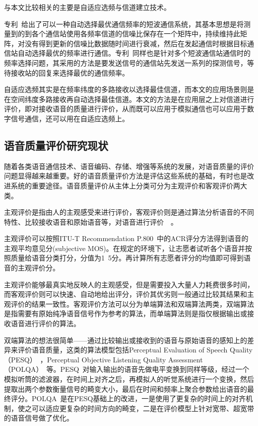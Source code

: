 与本文比较相关的主要是自适应选频与信道建立技术。

专利~\cite{harmon1982adaptive}给出了可以一种自动选择最优通信频率的短波通信系统，其基本思想是将测量到的到各个通信站使用各频率信道的信噪比保存在一个矩阵中，持续维持此矩阵，对没有得到更新的信噪比数据随时间进行衰减，然后在发起通信时根据目标通信站自动选择最优的频率进行通信。专利~\cite{mcrae1989frequency}同样也是针对多个短波通信站通信时的频率选择问题，其采用的方法是要发送信号的通信站先发送一系列的探测信号，等待接收站的回复来选择最优的通信频率。

自适应选频其实是在频率纬度的多路接收以选择最佳信道，而本文的应用场景则是在空间纬度多路接收再自动选择最佳信道。本文的方法是在应用层之上对信道进行评价，即对接收语音的质量进行评价，从而既可以应用于模拟通信也可以应用于数字信号通信，还可以用在自适应选频上。

\subsection{语音质量评价研究现状}

随着各类语音通信技术、语音编码、存储、增强等系统的发展，对语音质量的评价问题显得越来越重要。好的语音质量评价方法是评估这些系统的基础，有时也是改进系统的重要途径。语音质量评价从主体上分类可分为主观评价和客观评价两大类。

主观评价是指由人的主观感受来进行评价，客观评价则是通过算法分析语音的不同特性、比较接收语音和原始语音等，对语音进行评价~\cite{肖累累2013语音质量客观评价方法的研究}~\cite{moller2011speech}。

主观评价可以按照ITU-T Recommendation P.800~\cite{rec1996p}中的ACR评分方法得到语音的主观平均意见分(subjective MOS)。在规定的环境下，让志愿者试听各个语音并按照质量给语音分类打分，分值为1~5分。再计算所有志愿者评分的均值即可得到语音的主观评价分。

主观评价能够最真实地反映人的主观感受，但是需要投入大量人力耗费很多时间，而客观评价则可以快速、自动地给出评分，评价其优劣则一般通过比较其结果和主观评价的结果一致性。客观评价方法可以分为单端算法和双端算法两类，双端算法是指需要有原始纯净语音信号作为参考的算法，而单端算法则是指仅根据输出或接收语音进行评价的算法。

双端算法的想法很简单——通过比较输出或接收到的语音与原始语音的感知上的差异来评价语音质量，这类的算法模型包括Perceptual Evaluation of Speech Quality（PESQ）~\cite{recommendation2001perceptual}，Perceptual Objective Listening Quality Assessment（POLQA）~\cite{rec2011p}等。PESQ~\cite{recommendation2001perceptual}对输入输出的语音先做电平变换到同样等级，经过一个模拟听筒的滤波器，在时间上对齐之后，再模拟人的听觉系统进行一个变换，然后提取出两个参数衡量信号的畸变大小，最后在时间和频率上聚合参数给出语音的最终评分。POLQA~\cite{rec2011p}是在PESQ基础上的改进，一是使用了更复杂的时间上的对齐机制，使之可以适应更复杂的时间方向的畸变，二是在评价模型上针对宽带、超宽带的语音信号做了优化。

